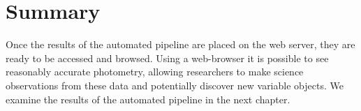 \section{Summary}
Once the results of the automated pipeline are placed on the web server, they are ready to be accessed and browsed. Using a web-browser it is possible to see reasonably accurate photometry, allowing researchers to make science observations from these data and potentially discover new variable objects. We examine the results of the automated pipeline in the next chapter. 

